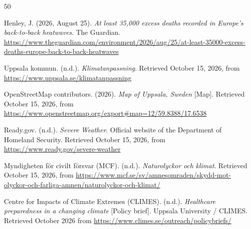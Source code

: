 \documentclass[a4paper,10pt]{article}
\begin{document}


	
\begin{thebibliography}{50}

Henley, J. (2026, August 25). 
\textit{At least 35,000 excess deaths recorded in Europe's back-to-back heatwaves}. 
The Guardian. 
\url{https://www.theguardian.com/environment/2026/aug/25/at-least-35000-excess-deaths-europe-back-to-back-heatwaves}

Uppsala kommun. (n.d.). 
\textit{Klimatanpassning}. 
Retrieved October 15, 2026, from \url{https://www.uppsala.se/klimatanpassning}

OpenStreetMap contributors. (2026). 
\textit{Map of Uppsala, Sweden} [Map]. 
Retrieved October 15, 2026, from \url{https://www.openstreetmap.org/export#map=12/59.8388/17.6538}

Ready.gov. (n.d.). 
\textit{Severe Weather}. 
Official website of the Department of Homeland Security. 
Retrieved October 15, 2026, from \url{https://www.ready.gov/severe-weather}

Myndigheten för civilt försvar (MCF). (n.d.). 
\textit{Naturolyckor och klimat}. 
Retrieved October 15, 2026, from \url{https://www.mcf.se/sv/amnesomraden/skydd-mot-olyckor-och-farliga-amnen/naturolyckor-och-klimat/}

Centre for Impacts of Climate Extremes (CLIMES). (n.d.). 
\textit{Healthcare preparedness in a changing climate} [Policy brief]. 
Uppsala University / CLIMES. 
Retrieved October 2026 from \url{https://www.climes.se/outreach/policybriefs/}
		
\end{thebibliography}

	
	
%	
%	
%	
\end{document}
